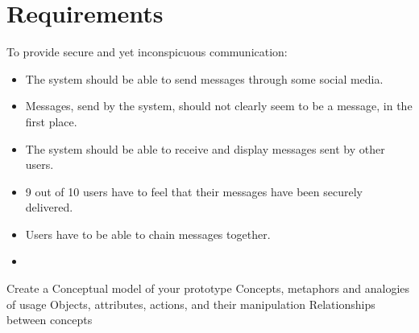 \section{Requirements}
To provide secure and yet inconspicuous communication:
\begin{itemize}
    \item The system should be able to send messages through some social media.
    \item Messages, send by the system, should not clearly seem to be a message, in the first place.
    \item The system should be able to receive and display messages sent by other users.
    \item 9 out of 10 users have to feel that their messages have been securely delivered.
    \item Users have to be able to chain messages together.
    \item 
\end{itemize}


Create a Conceptual model of your prototype
        Concepts, metaphors and analogies of usage
        Objects, attributes, actions, and their manipulation
        Relationships between concepts